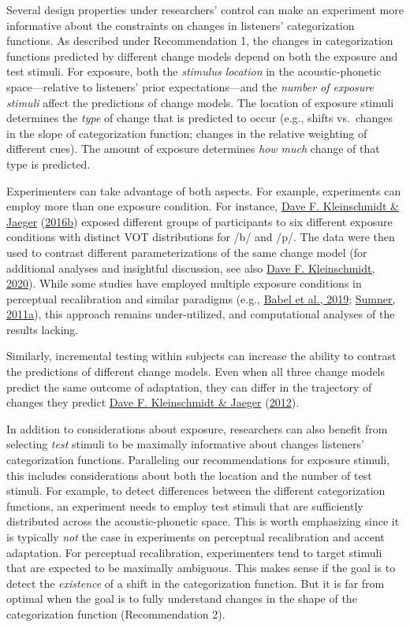 \documentclass[
  11pt,
  english,
  man,floatsintext]{apa6}
\begin{document}
Several design properties under researchers' control can make an experiment more informative about the constraints on changes in listeners' categorization functions. As described under Recommendation 1, the changes in categorization functions predicted by different change models depend on both the exposure and test stimuli. For exposure, both the \emph{stimulus location} in the acoustic-phonetic space---relative to listeners' prior expectations---and the \emph{number of exposure stimuli} affect the predictions of change models. The location of exposure stimuli determines the \emph{type} of change that is predicted to occur (e.g., shifts vs.~changes in the slope of categorization function; changes in the relative weighting of different cues). The amount of exposure determines \emph{how much} change of that type is predicted.

Experimenters can take advantage of both aspects. For example, experiments can employ more than one exposure condition. For instance, \protect\hyperlink{ref-kleinschmidt-jaeger2016cogsci}{Dave F. Kleinschmidt \& Jaeger} (\protect\hyperlink{ref-kleinschmidt-jaeger2016cogsci}{2016b}) exposed different groups of participants to six different exposure conditions with distinct VOT distributions for /b/ and /p/. The data were then used to contrast different parameterizations of the same change model (for additional analyses and insightful discussion, see also \protect\hyperlink{ref-kleinschmidt2020}{Dave F. Kleinschmidt, 2020}). While some studies have employed multiple exposure conditions in perceptual recalibration and similar paradigms (e.g., \protect\hyperlink{ref-babel2019}{Babel et al., 2019}; \protect\hyperlink{ref-sumner2011}{Sumner, 2011a}), this approach remains under-utilized, and computational analyses of the results lacking.

Similarly, incremental testing within subjects can increase the ability to contrast the predictions of different change models. Even when all three change models predict the same outcome of adaptation, they can differ in the trajectory of changes they predict \protect\hyperlink{ref-kleinschmidt-jaeger2012}{Dave F. Kleinschmidt \& Jaeger} (\protect\hyperlink{ref-kleinschmidt-jaeger2012}{2012}).

In addition to considerations about exposure, researchers can also benefit from selecting \emph{test} stimuli to be maximally informative about changes listeners' categorization functions. Paralleling our recommendations for exposure stimuli, this includes considerations about both the location and the number of test stimuli. For example, to detect differences between the different categorization functions, an experiment needs to employ test stimuli that are sufficiently distributed across the acoustic-phonetic space. This is worth emphasizing since it is typically \emph{not} the case in experiments on perceptual recalibration and accent adaptation. For perceptual recalibration, experimenters tend to target stimuli that are expected to be maximally ambiguous. This makes sense if the goal is to detect the \emph{existence} of a shift in the categorization function. But it is far from optimal when the goal is to fully understand changes in the shape of the categorization function (Recommendation 2).
\end{document}
